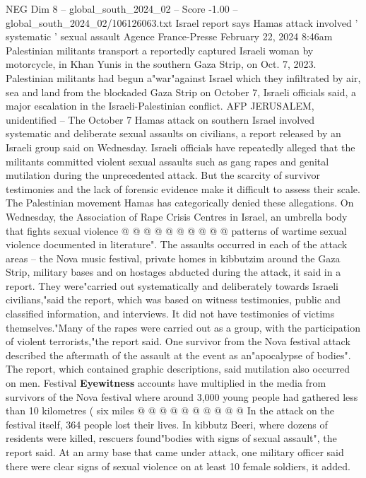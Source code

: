 \begin{textsample}{NEG Dim 8 – global\_south\_2024\_02 – Score -1.00 – global\_south\_2024\_02/106126063.txt}  \label{ex:f8_neg_251}
Israel report says Hamas attack involved ' systematic ' sexual assault Agence France-Presse February 22, 2024 8:46am Palestinian militants transport a reportedly captured Israeli woman by motorcycle, in Khan Yunis in the southern Gaza Strip, on Oct. 7, 2023.
Palestinian militants had begun a"war"against Israel which they infiltrated by air, sea and land from the blockaded Gaza Strip on October 7, Israeli officials said, a major escalation in the Israeli-Palestinian conflict.
AFP JERUSALEM, unidentified -- The October 7 Hamas attack on southern Israel involved systematic and deliberate sexual assaults on civilians, a report released by an Israeli group said on Wednesday.
Israeli officials have repeatedly alleged that the militants committed violent sexual assaults such as gang rapes and genital mutilation during the unprecedented attack.
But the scarcity of survivor testimonies and the lack of forensic evidence make it difficult to assess their scale.
The Palestinian movement Hamas has categorically denied these allegations.
On Wednesday, the Association of Rape Crisis Centres in Israel, an umbrella body that fights sexual violence @ @ @ @ @ @ @ @ @ @ patterns of wartime sexual violence documented in literature".
The assaults occurred in each of the attack areas -- the Nova music festival, private homes in kibbutzim around the Gaza Strip, military bases and on hostages abducted during the attack, it said in a report.
They were"carried out systematically and deliberately towards Israeli civilians,"said the report, which was based on witness testimonies, public and classified information, and interviews.
It did not have testimonies of victims themselves."Many of the rapes were carried out as a group, with the participation of violent terrorists,"the report said.
One survivor from the Nova festival attack described the aftermath of the assault at the event as an"apocalypse of bodies".
The report, which contained graphic descriptions, said mutilation also occurred on men.
Festival \textbf{Eyewitness} accounts have multiplied in the media from survivors of the Nova festival where around 3,000 young people had gathered less than 10 kilometres ( six miles @ @ @ @ @ @ @ @ @ @ In the attack on the festival itself, 364 people lost their lives.
In kibbutz Beeri, where dozens of residents were killed, rescuers found"bodies with signs of sexual assault", the report said.
At an army base that came under attack, one military officer said there were clear signs of sexual violence on at least 10 female soldiers, it added.

\end{textsample}
